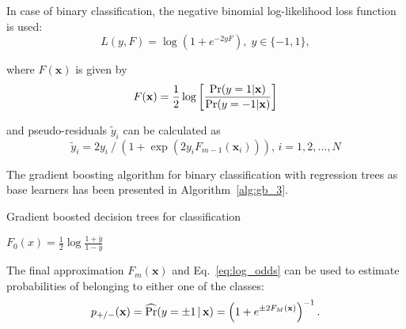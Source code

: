 \documentclass[magisterska, english]{pwr_wmat_praca_dyplomowa}
\theoremstyle{plain}
\numberwithin{theorem}{chapter}
\theoremstyle{definition}
\numberwithin{theorem}{chapter}
\newcommand*\mean[1]{\bar{#1}}
\renewcommand{\Pr}{\qopname \relax m{Pr}}
\begin{document}
In case of binary classification, the negative binomial log-likelihood loss function is used:
\begin{equation}\label{eq:nll}
    L(y,F) = \log\left(1+e^{-2yF}\right),\; y\in\{-1,1\},
\end{equation}

where $F(\mathbf{x})$ is given by
\begin{equation}\label{eq:log_odds}
    F(\mathbf{x}) = \frac12\log\left[\frac{\Pr(y=1|\mathbf{x})}{\Pr(y=-1|\mathbf{x})}\right]
\end{equation}

and pseudo-residuals $\tilde{y}_i$ can be calculated as
\begin{equation}
    \tilde{y}_i  = 2y_i\mathbin{/}\left(1+\exp(2y_iF_{m-1}(\mathbf{x}_i))\right),\, i=1,2,\ldots,N
\end{equation}

The gradient boosting algorithm for binary classification with regression trees as base learners has been presented in Algorithm~\ref{alg:gb_3}.

\begin{algorithm}[H]
\caption{Gradient boosted decision trees for classification}\label{alg:gb_3}
 $\displaystyle F_0(x) = \frac12\log\frac{1+\mean{y}}{1-\mean{y}}$\\
\end{algorithm}

The final approximation $F_m(\mathbf{x})$ and Eq.~\eqref{eq:log_odds} can be used to estimate probabilities of belonging to either one of the classes:
\begin{equation}
    p_{+\mathbin{/}-}(\mathbf{x}) = \widehat{\Pr}(y=\pm 1\,|\,\mathbf{x}) = \left(1+e^{\pm 2F_M(\mathbf{x})}\right)^{-1}.
\end{equation}
\end{document}
